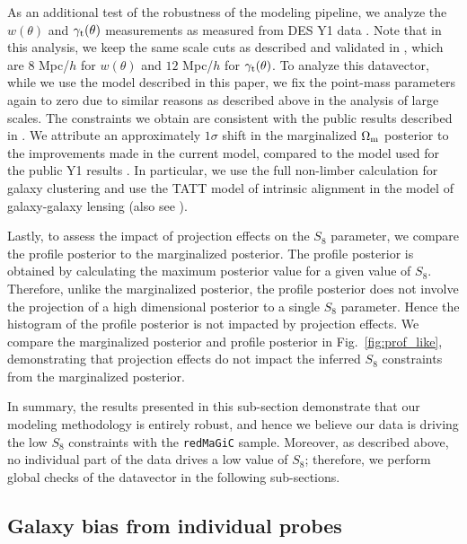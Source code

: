 \documentclass[aps, prd,twocolumn,superscriptaddress,nofootinbib,preprintnumbers]{revtex4-1}
\newcommand{\gammat}{\ensuremath{\gamma_{\rm t}(\theta)}}
\newcommand{\wtheta}{\ensuremath{w(\theta)}}
\newcommand{\redmagic}{\texttt{redMaGiC} }
\begin{document}
As an additional test of the robustness of the modeling pipeline, we analyze the $\wtheta$ and $\gammat$ measurements as measured from DES Y1 data \citep{Abbott_2018}. Note that in this analysis, we keep the same scale cuts as described and validated in \citet{Abbott_2018}, which are $8$ Mpc/$h$ for $\wtheta$ and $12$ Mpc/$h$ for $\gammat$. To analyze this datavector, while we use the model described in this paper, we fix the point-mass parameters again to zero due to similar reasons as described above in the analysis of large scales. The constraints we obtain are consistent with  the public results  described in \citet{Abbott_2018}. We attribute an approximately $1\sigma$ shift in the marginalized $\Omega_{\rm m}$ posterior to the improvements made in the current model, compared to the model used for the public Y1 results \citep{Krause2017}. In particular, we use the full non-limber calculation for galaxy clustering and use the TATT model of intrinsic alignment in the model of galaxy-galaxy lensing (also see \citet{Fang_nonlimber}). 

Lastly, to assess the impact of projection effects on the $S_8$ parameter, we compare the profile posterior to the marginalized posterior. The profile posterior is obtained by calculating the maximum posterior value for a given value of $S_8$. Therefore, unlike the marginalized posterior, the profile posterior does not involve the projection of a high dimensional posterior to a single $S_8$ parameter. Hence the histogram of the profile posterior is not impacted by projection effects. We compare the marginalized posterior and profile posterior in Fig.~\ref{fig:prof_like}, demonstrating that projection effects do not impact the inferred $S_8$ constraints from the marginalized posterior.  
 
In summary,  the results presented in this sub-section demonstrate that our modeling methodology is entirely robust, and hence we believe our data is driving the low $S_8$ constraints with the \redmagic  sample. Moreover, as described above, no individual part of the data drives a low value of $S_8$; therefore, we perform global checks of the datavector in the following sub-sections.

\subsection{Galaxy bias from individual probes}
\end{document}
